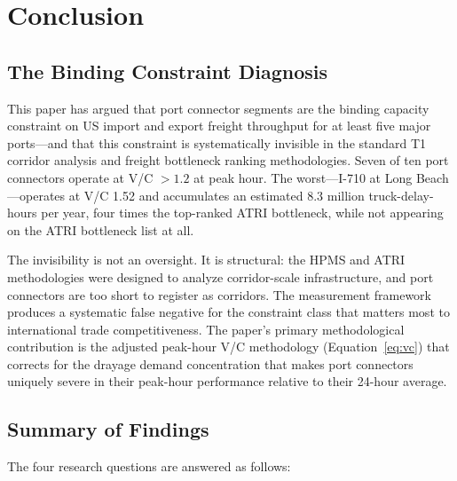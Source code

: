 \section{Conclusion}
\label{sec:conclusion}

\subsection{The Binding Constraint Diagnosis}

This paper has argued that port connector segments are the binding capacity constraint on US import and export freight throughput for at least five major ports---and that this constraint is systematically invisible in the standard T1 corridor analysis and freight bottleneck ranking methodologies. Seven of ten port connectors operate at V/C $> 1.2$ at peak hour. The worst---I-710 at Long Beach---operates at V/C 1.52 and accumulates an estimated 8.3 million truck-delay-hours per year, four times the top-ranked ATRI bottleneck, while not appearing on the ATRI bottleneck list at all.

The invisibility is not an oversight. It is structural: the HPMS and ATRI methodologies were designed to analyze corridor-scale infrastructure, and port connectors are too short to register as corridors. The measurement framework produces a systematic false negative for the constraint class that matters most to international trade competitiveness. The paper's primary methodological contribution is the adjusted peak-hour V/C methodology (Equation~\ref{eq:vc}) that corrects for the drayage demand concentration that makes port connectors uniquely severe in their peak-hour performance relative to their 24-hour average.

\subsection{Summary of Findings}

The four research questions are answered as follows:

